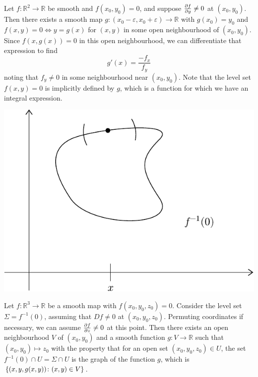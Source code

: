 \documentclass[a4paper]{article}
\begin{document}
\begin{example}
	Let \( f \colon \mathbb R^2 \to \mathbb R \) be smooth and \( f(x_0, y_0) = 0 \), and suppose \( \pdv{f}{y} \neq 0 \) at \( (x_0, y_0) \).
	Then there exists a smooth map \( g \colon (x_0 - \varepsilon, x_0 + \varepsilon) \to \mathbb R \) with \( g(x_0) = y_0 \) and \( f(x,y) = 0 \iff y = g(x) \) for \( (x,y) \) in some open neighbourhood of \( (x_0, y_0) \).
	Since \( f(x,g(x)) = 0 \) in this open neighbourhood, we can differentiate that expression to find
	\[
		g'(x) = \frac{-f_x}{f_y}
	\]
	noting that \( f_y \neq 0 \) in some neighbourhood near \( (x_0, y_0) \).
	Note that the level set \( f(x,y) = 0 \) is implicitly defined by \( g \), which is a function for which we have an integral expression.
	\begin{center}
		\includegraphics[scale=0.8]{Implicit}
	\end{center}
\end{example}

\begin{example}
	Let \( f \colon \mathbb R^3 \to \mathbb R \) be a smooth map with \( f(x_0, y_0, z_0) = 0 \).
	Consider the level set \( \Sigma = f^{-1}(0) \), assuming that \( Df \neq 0 \) at \( (x_0, y_0, z_0) \).
	Permuting coordinates if necessary, we can assume \( \pdv{f}{z} \neq 0 \) at this point.
	Then there exists an open neighbourhood \( V \) of \( (x_0, y_0) \) and a smooth function \( g \colon V \to \mathbb R \) such that \( (x_0, y_0) \mapsto z_0 \) with the property that for an open set \( (x_0, y_0, z_0) \in U \), the set \( f^{-1}(0) \cap U = \Sigma \cap U \) is the graph of the function \( g \), which is \( \qty{ (x,y,g(x,y)) \colon (x,y) \in V } \).
\end{example}
\end{document}
